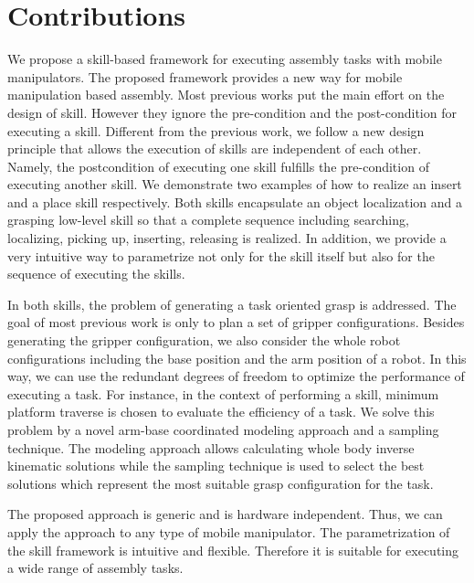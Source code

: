 \section{Contributions}
We propose a skill-based framework for executing assembly tasks with mobile manipulators. The proposed framework provides a new way for mobile manipulation based assembly. Most previous works put the main effort on the design of skill. However they ignore the pre-condition and the post-condition for executing a skill. Different from the previous work, we follow a new design principle that allows the execution of skills are independent of each other. Namely, the postcondition of executing one skill fulfills the pre-condition of executing another skill. We demonstrate two examples of how to realize an insert and a place skill respectively. Both skills encapsulate an object localization and a grasping low-level skill so that a complete sequence including searching, localizing, picking up, inserting, releasing is realized. In addition, we provide a very intuitive way to parametrize not only for the skill itself but also for the sequence of executing the skills. 

In both skills, the problem of generating a task oriented grasp is addressed. The goal of most previous work is only to plan a set of gripper configurations. Besides generating the gripper configuration, we also consider the whole robot configurations including the base position and the arm position of  a robot. In this way, we can use the redundant degrees of freedom to optimize the performance of executing a task. For instance, in the context of performing a skill, minimum platform traverse is chosen to evaluate the efficiency of a task. We solve this problem by a novel arm-base coordinated modeling approach and a sampling technique. The modeling approach allows calculating whole body inverse kinematic solutions while the sampling technique is used to select the best solutions which represent the most suitable grasp configuration for the task.  

The proposed approach is generic and is hardware independent. Thus, we can apply the approach to any type of mobile manipulator. The parametrization of the skill framework is intuitive and flexible. Therefore it is suitable for executing a wide range of assembly tasks.

